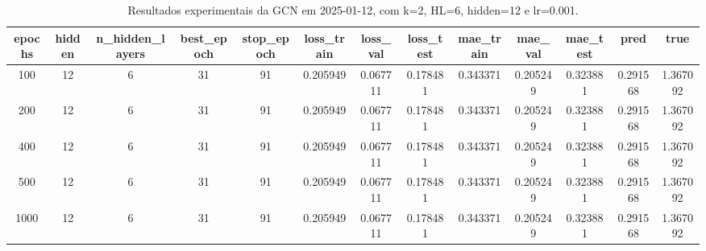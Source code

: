 \begin{table}[h]
\centering
\caption{Resultados experimentais da GCN em 2025-01-12, com k=2, HL=6, hidden=12 e lr=0.001.}
\label{tab:gcn_results_k2_hl6_h12_d20250112}
\begin{tabular}{ccccccccccccc}
\toprule
epochs & hidden & n\_hidden\_layers & best\_epoch & stop\_epoch & loss\_train & loss\_val & loss\_test & mae\_train & mae\_val & mae\_test & pred & true \\
\midrule
100 & 12 & 6 & 31 & 91 & 0.205949 & 0.067711 & 0.178481 & 0.343371 & 0.205249 & 0.323881 & 0.291568 & 1.367092 \\
200 & 12 & 6 & 31 & 91 & 0.205949 & 0.067711 & 0.178481 & 0.343371 & 0.205249 & 0.323881 & 0.291568 & 1.367092 \\
400 & 12 & 6 & 31 & 91 & 0.205949 & 0.067711 & 0.178481 & 0.343371 & 0.205249 & 0.323881 & 0.291568 & 1.367092 \\
500 & 12 & 6 & 31 & 91 & 0.205949 & 0.067711 & 0.178481 & 0.343371 & 0.205249 & 0.323881 & 0.291568 & 1.367092 \\
1000 & 12 & 6 & 31 & 91 & 0.205949 & 0.067711 & 0.178481 & 0.343371 & 0.205249 & 0.323881 & 0.291568 & 1.367092 \\
\bottomrule
\end{tabular}
\end{table}
